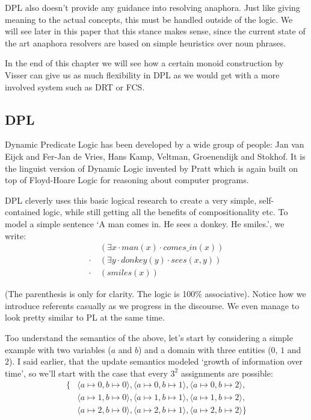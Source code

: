 \documentclass[12pt]{article}
\begin{document}
\begin{itemize}
DPL also doesn't provide any guidance into resolving anaphora. Just like giving meaning to the actual concepts, this must be handled outside of the logic. We will see later in this paper that this stance makes sense, since the current state of the art anaphora resolvers are based on simple heuristics over noun phrases.

In the end of this chapter we will see how a certain monoid construction by Visser can give us as much flexibility in DPL as we would get with a more involved system such as DRT or FCS.
\end{itemize}

\subsection{DPL}

Dynamic Predicate Logic has been developed by a wide group of people: Jan van Eijck and Fer-Jan de Vries\cite{eijck1992dynamic}, Hans Kamp, Veltman, Groenendijk and Stokhof. It is the linguist version of Dynamic Logic invented by Pratt\cite{pratt1976semantical} which is again built on top of Floyd-Hoare Logic for reasoning about computer programs.

DPL cleverly uses this basic logical research to create a very simple, self-contained logic, while still getting all the benefits of compositionality etc. To model a simple sentence `A man comes in. He sees a donkey. He smiles.', we write:
%
\begin{align}
&(\exists x \cdot man(x) \cdot comes\_in(x)) \nonumber\\
\cdot\ &(\exists y \cdot donkey(y) \cdot sees(x,y)) \nonumber\\
\cdot\ &(smiles(x)) \nonumber
\end{align}

(The parenthesis is only for clarity. The logic is 100\% associative). Notice how we introduce referents casually as we progress in the discourse. We even manage to look pretty similar to PL at the same time. 

Too understand the semantics of the above, let's start by considering a simple example with two variables ($a$ and $b$) and a domain with three entities ($0$, $1$ and $2$). I said earlier, that the update semantics modeled `growth of information over time', so we'll start with the case that every $3^2$ assignments are possible:
%
\begin{align}
\{&\langle a\mapsto0,b\mapsto0\rangle, \langle a\mapsto0,b\mapsto1\rangle, \langle a\mapsto0,b\mapsto2\rangle,\nonumber\\
&\langle a\mapsto1,b\mapsto0\rangle, \langle a\mapsto1,b\mapsto1\rangle, \langle a\mapsto1,b\mapsto2\rangle,\nonumber\\
&\langle a\mapsto2,b\mapsto0\rangle, \langle a\mapsto2,b\mapsto1\rangle, \langle a\mapsto2,b\mapsto2\rangle\}\label{dpl_all_states}
\end{align}
\end{document}
